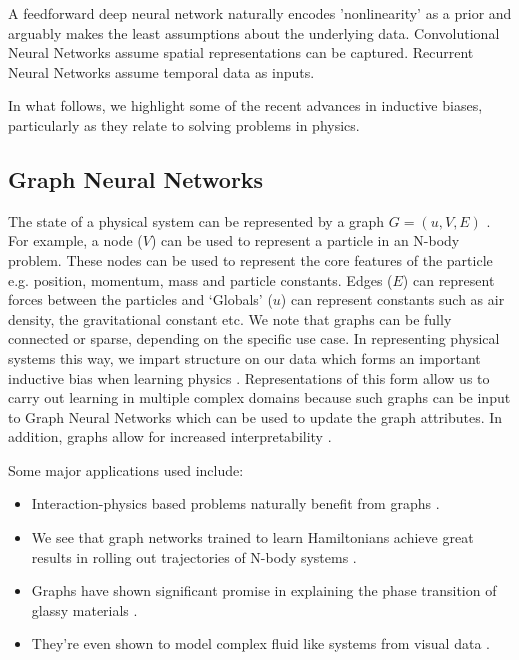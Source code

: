 \documentclass{article}
\begin{document}
A feedforward deep neural network naturally encodes 'nonlinearity' as a prior and arguably makes the least assumptions about the underlying data. Convolutional Neural Networks assume spatial representations can be captured. Recurrent Neural Networks assume temporal data as inputs. 

In what follows, we highlight some of the recent advances in inductive biases, particularly as they relate to solving problems in physics.

\subsection{Graph Neural Networks}

The state of a physical system can be represented by a graph $G = (u,V,E)$ \cite{battaglia_relational_2018}. For example, a node ($V$) can be used to represent a particle in an N-body problem. These nodes can be used to represent the core features of the particle e.g. position, momentum, mass and particle constants. Edges ($E$) can represent forces between the particles and `Globals' ($u$) can represent constants such as air density, the gravitational constant etc. We note that graphs can be fully connected or sparse, depending on the specific use case. In representing physical systems this way, we impart structure on our data which forms an important inductive bias when learning physics \cite{battaglia_interaction_2016, battaglia_relational_2018, sanchez-gonzalez_graph_2018,seo_differentiable_2019,cranmer_learning_2019, seo_physics-aware_2020, sanchez-gonzalez_learning_2020,lamb_graph_2020,cranmer_lagrangian_2020}. Representations of this form allow us to carry out learning in multiple complex domains because such graphs can be input to Graph Neural Networks which can be used to update the graph attributes. In addition, graphs allow for increased interpretability \cite{battaglia_relational_2018}.

Some major applications used include:
\begin{itemize}
\item Interaction-physics based problems naturally benefit from graphs \cite{battaglia_relational_2018}. 
\item We see that graph networks trained to learn Hamiltonians achieve great results in rolling out trajectories of N-body systems \cite{sanchez-gonzalez_hamiltonian_2019}. 
\item Graphs have shown significant promise in explaining the phase transition of glassy materials \cite{bapst_unveiling_2020}. 
\item They're even shown to model complex fluid like systems from visual data \cite{sanchez-gonzalez_learning_2020}. 
\end{itemize}
\end{document}

